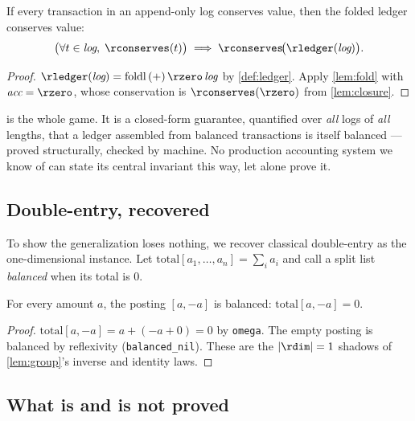 \begin{theorem}
\label{thm:conservation}
If every transaction in an append-only log conserves value, then the
folded ledger conserves value:
\[
  \big(\forall t \in \textit{log},\; \rconserves(t)\big)
  \;\Longrightarrow\;
  \rconserves\!\big(\rledger(\textit{log})\big).
\]
\end{theorem}

\begin{proof}
$\rledger(\textit{log}) = \mathrm{foldl}\,(+)\,\rzero\,\textit{log}$ by
\cref{def:ledger}. Apply \cref{lem:fold} with $\textit{acc} = \rzero$,
whose conservation is $\rconserves(\rzero)$ from \cref{lem:closure}.
\end{proof}

 is the whole game. It is a closed-form guarantee,
quantified over \emph{all} logs of \emph{all} lengths, that a ledger
assembled from balanced transactions is itself balanced --- proved
structurally, checked by machine. No production accounting system we know
of can state its central invariant this way, let alone prove it.

\subsection{Double-entry, recovered}

To show the generalization loses nothing, we recover classical
double-entry as the one-dimensional instance. Let
$\mathrm{total}[a_1,\dots,a_n] = \sum_i a_i$ and call a split list
\emph{balanced} when its total is $0$.

\begin{theorem}
\label{thm:double-entry}
For every amount $a$, the posting $[a, -a]$ is balanced:
$\mathrm{total}[a,-a] = 0$.
\end{theorem}

\begin{proof}
$\mathrm{total}[a,-a] = a + (-a + 0) = 0$ by \texttt{omega}. The empty
posting is balanced by reflexivity (\texttt{balanced\_nil}). These
are the $|\rdim|=1$ shadows of \cref{lem:group}'s inverse and identity
laws.
\end{proof}

\subsection{What is and is not proved}

